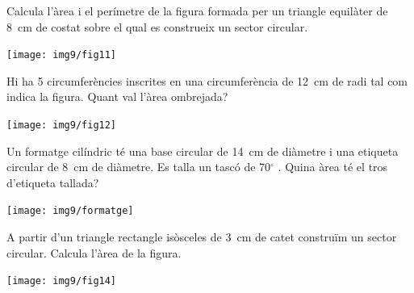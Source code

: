 \begin{mylist}
  
 \vspace*{-1.5cm}
 \exer \begin{minipage}[t]{0.7\textwidth}
 	Calcula l'àrea i el perímetre de la figura formada per un triangle equilàter de 8~cm de costat sobre el qual es construeix un sector circular. 
 \end{minipage}
 \begin{minipage}{0.3\textwidth}
 	\centering
 	\vspace{1.5cm}
 	\texttt{[image: img9/fig11]}
 \end{minipage}
 
 
\vspace*{-1.5cm}
\exer \begin{minipage}[t]{0.7\textwidth}
	 Hi ha 5 circumferències inscrites en una circumferència de 12~cm de radi tal com indica la figura. Quant val l'àrea ombrejada?
\end{minipage}
\begin{minipage}{0.3\textwidth}
	\centering
	\vspace{1.5cm}
	\texttt{[image: img9/fig12]}
\end{minipage}
 
 
\vspace*{-1.5cm}
\exer \begin{minipage}[t]{0.7\textwidth}
	Un formatge cilíndric té una base circular de 14~cm de diàmetre i una etiqueta circular de 8~cm de diàmetre. Es talla un tascó de 70${}^\circ$ . Quina àrea té el tros d'etiqueta tallada? 
	
\end{minipage}
\begin{minipage}{0.3\textwidth}
	\centering
	\vspace{1.5cm}
	\texttt{[image: img9/formatge]}
\end{minipage}
 
  
\pagebreak
\mbox{}
 
\vspace*{-1.5cm}
\exer[1] \begin{minipage}[t]{0.62\textwidth}
	A partir d'un triangle rectangle isòsceles de 3~cm de catet construïm un sector circular. Calcula l'àrea de la figura.
\end{minipage}
\begin{minipage}{0.3\textwidth}
	\centering
	\vspace{1.5cm}
	\texttt{[image: img9/fig14]}
\end{minipage}
 

\end{mylist}
